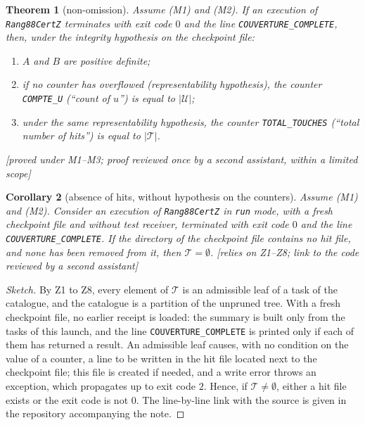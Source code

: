 \documentclass[11pt,a4paper]{amsart}
\theoremstyle{plain}
\newtheorem{theorem}{Theorem}[section]
\newtheorem{corollary}[theorem]{Corollary}
\theoremstyle{definition}
\numberwithin{equation}{section}
\newcommand{\Uc}{\mathcal{U}}
\newcommand{\Tc}{\mathcal{T}}
\newcommand{\st}[1]{\textup{\textsf{\small[#1]}}}
\begin{document}
\begin{theorem}[non-omission]\label{thm:nonomission}
Assume \textup{(M1)} and \textup{(M2)}. If an execution of \texttt{Rang88CertZ} terminates with exit code $0$ and the line \texttt{COUVERTURE\_COMPLETE}, then, under the integrity hypothesis on the checkpoint file:
\begin{enumerate}[label=\textup{(\arabic*)}]
\item $A$ and $B$ are positive definite;
\item if no counter has overflowed (representability hypothesis), the counter \texttt{COMPTE\_U} (``count of $u$'') is equal to $|\Uc|$;
\item under the same representability hypothesis, the counter \texttt{TOTAL\_TOUCHES} (``total number of hits'') is equal to $|\Tc|$.
\end{enumerate}
\st{proved under M1--M3; proof reviewed once by a second assistant, within a limited scope}
\end{theorem}

\begin{corollary}[absence of hits, without hypothesis on the counters]\label{cor:touche}
Assume \textup{(M1)} and \textup{(M2)}. Consider an execution of \texttt{Rang88CertZ} in \texttt{run} mode, with a fresh checkpoint file and without test receiver, terminated with exit code $0$ and the line \texttt{COUVERTURE\_COMPLETE}. If the directory of the checkpoint file contains no hit file, and none has been removed from it, then $\Tc=\emptyset$.
\st{relies on Z1--Z8; link to the code reviewed by a second assistant}
\end{corollary}

\begin{proof}[Sketch]
By Z1 to Z8, every element of $\Tc$ is an admissible leaf of a task of the catalogue, and the catalogue is a partition of the unpruned tree. With a fresh checkpoint file, no earlier receipt is loaded: the summary is built only from the tasks of this launch, and the line \texttt{COUVERTURE\_COMPLETE} is printed only if each of them has returned a result. An admissible leaf causes, with no condition on the value of a counter, a line to be written in the hit file located next to the checkpoint file; this file is created if needed, and a write error throws an exception, which propagates up to exit code $2$. Hence, if $\Tc\ne\emptyset$, either a hit file exists or the exit code is not $0$. The line-by-line link with the source is given in the repository accompanying the note.
\end{proof}
\end{document}
